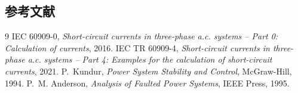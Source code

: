\subsection{参考文献}
{\renewcommand{\section}[2]{}%
\begin{thebibliography}{9}\small
{} IEC 60909-0, \emph{Short-circuit currents in three-phase
a.c. systems -- Part 0: Calculation of currents}, 2016.
 IEC TR 60909-4, \emph{Short-circuit currents in three-phase
a.c. systems -- Part 4: Examples for the calculation of short-circuit currents}, 2021.
 P.~Kundur, \emph{Power System Stability and Control},
McGraw-Hill, 1994.
 P.~M. Anderson, \emph{Analysis of Faulted Power Systems},
IEEE Press, 1995.
\end{thebibliography}}
